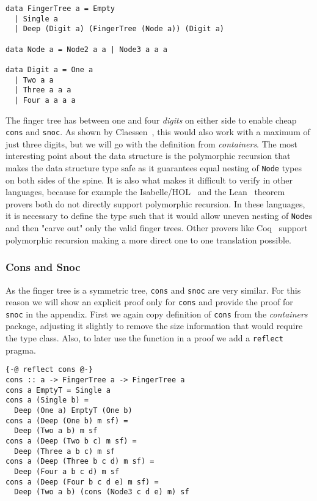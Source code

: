 \documentclass[sigplan,screen]{acmart}
\begin{document}
\begin{lstlisting}
data FingerTree a = Empty
  | Single a
  | Deep (Digit a) (FingerTree (Node a)) (Digit a)

data Node a = Node2 a a | Node3 a a a

data Digit a = One a
  | Two a a
  | Three a a a
  | Four a a a a
\end{lstlisting}

The finger tree has between one and four \textit{digits} on either side to enable cheap \texttt{cons} and \texttt{snoc}. As shown by Claessen~\cite{fingertrees_new}, this would also work with a maximum of just three digits, but we will go with the definition from \textit{containers}. The most interesting point about the data structure is the polymorphic recursion that makes the data structure type safe as it guarantees equal nesting of \texttt{Node} types on both sides of the spine. It is also what makes it difficult to verify in other languages, because for example the Isabelle/HOL~\cite{isabelle} and the Lean~\cite{lean} theorem provers both do not directly support polymorphic recursion. In these languages, it is necessary to define the type such that it would allow uneven nesting of \texttt{Node}s and then "carve out" only the valid finger trees. Other provers like Coq~\cite{coq} support polymorphic recursion making a more direct one to one translation possible.

\subsubsection{Cons and Snoc}

As the finger tree is a symmetric tree, \texttt{cons} and \texttt{snoc} are very similar. For this reason we will show an explicit proof only for \texttt{cons} and provide the proof for \texttt{snoc} in the appendix. First we again copy definition of \texttt{cons} from the \textit{containers} package, adjusting it slightly to remove the size information that would require the type class. Also, to later use the function in a proof we add a \texttt{reflect} pragma.

\begin{lstlisting}
{-@ reflect cons @-}
cons :: a -> FingerTree a -> FingerTree a
cons a EmptyT = Single a
cons a (Single b) =
  Deep (One a) EmptyT (One b)
cons a (Deep (One b) m sf) =
  Deep (Two a b) m sf
cons a (Deep (Two b c) m sf) =
  Deep (Three a b c) m sf
cons a (Deep (Three b c d) m sf) =
  Deep (Four a b c d) m sf
cons a (Deep (Four b c d e) m sf) =
  Deep (Two a b) (cons (Node3 c d e) m) sf
\end{lstlisting}
\end{document}
